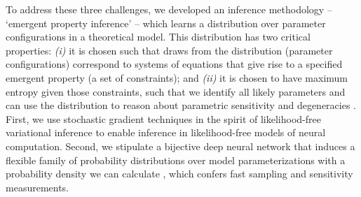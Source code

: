 \documentclass[11pt]{article}
\begin{document}
To address these three challenges, we developed an inference methodology -- `emergent property inference' -- which learns a distribution over parameter configurations in a theoretical model.  
This distribution has two critical properties: \emph{(i)} it is chosen such that draws from the distribution (parameter configurations) correspond to systems of equations that give rise to a specified emergent property (a set of constraints); and \emph{(ii)} it is chosen to have maximum entropy given those constraints, such that we identify all likely parameters and can use the distribution to reason about parametric sensitivity and degeneracies \cite{transtrum2015perspective}.  
First, we use stochastic gradient techniques in the spirit of likelihood-free variational inference \cite{tran2017hierarchical} to enable inference in likelihood-free models of neural computation.
Second, we stipulate a bijective deep neural network that induces a flexible family of probability distributions over model parameterizations with a probability density we can calculate \cite{rezende2015variational, dinh2017density, papamakarios2017masked}, which confers fast sampling and sensitivity measurements.
\end{document}
